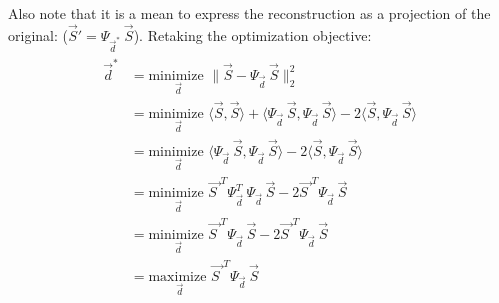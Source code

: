 \documentclass[11pt]{scrartcl} %
\begin{document}

Also note that it is a mean to express the reconstruction as a projection of the original: (\(\vec{S}' = \Psi_{\vec{d}^*\;}\vec{S}\)). Retaking the optimization objective:
  \begin{align*}
    \begin{aligned}
      \vec{d}^* &=  \underset{ \vec{d}}{\text{minimize }}
      \bigg\lVert \vec{S}- \Psi_{\vec{d}\;} \vec{S} \bigg\rVert_2^2\\%
      &=  \underset{ \vec{d}}{\text{minimize }} \langle \vec{S}, \vec{S} \rangle + \langle \Psi_{\vec{d}\;} \vec{S}, \Psi_{\vec{d}\;} \vec{S} \rangle - 2 \langle \vec{S},  \Psi_{\vec{d}\;} \vec{S} \rangle\\
      &=  \underset{ \vec{d}}{\text{minimize }} \langle \Psi_{\vec{d}\;} \vec{S}, \Psi_{\vec{d}\;} \vec{S} \rangle - 2 \langle \vec{S},  \Psi_{\vec{d}\;} \vec{S} \rangle\\
      &=  \underset{ \vec{d}}{\text{minimize }} \vec{S\;}^T \Psi_{\vec{d}\;}^T\Psi_{\vec{d}\;} \vec{S}  - 2 \vec{S\;}^T \Psi_{\vec{d}\;} \vec{S}\\
      &=  \underset{ \vec{d}}{\text{minimize }} \vec{S\;}^T \Psi_{\vec{d}\;} \vec{S}  - 2 \vec{S\;}^T \Psi_{\vec{d}\;} \vec{S}\\
      &=  \underset{ \vec{d}}{\text{maximize }} \vec{S\;}^T \Psi_{\vec{d}\;} \vec{S}\\
    \end{aligned}
  \end{align*}
\end{document}
